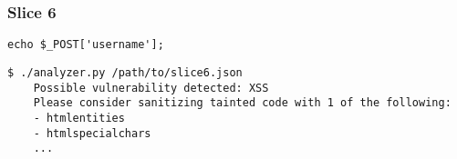 \subsubsection*{Slice 6}
\label{sec:experimental.examples.slice06}

\begin{lstlisting}[label={php.slice06}]
    echo $_POST['username'];
\end{lstlisting}

\begin{lstlisting}[label={out.example.slice06},
        caption={Shortened example XSS vulnerable slice analysis output}]
    $ ./analyzer.py /path/to/slice6.json
    Possible vulnerability detected: XSS
    Please consider sanitizing tainted code with 1 of the following:
    - htmlentities
    - htmlspecialchars
    ...
\end{lstlisting}
